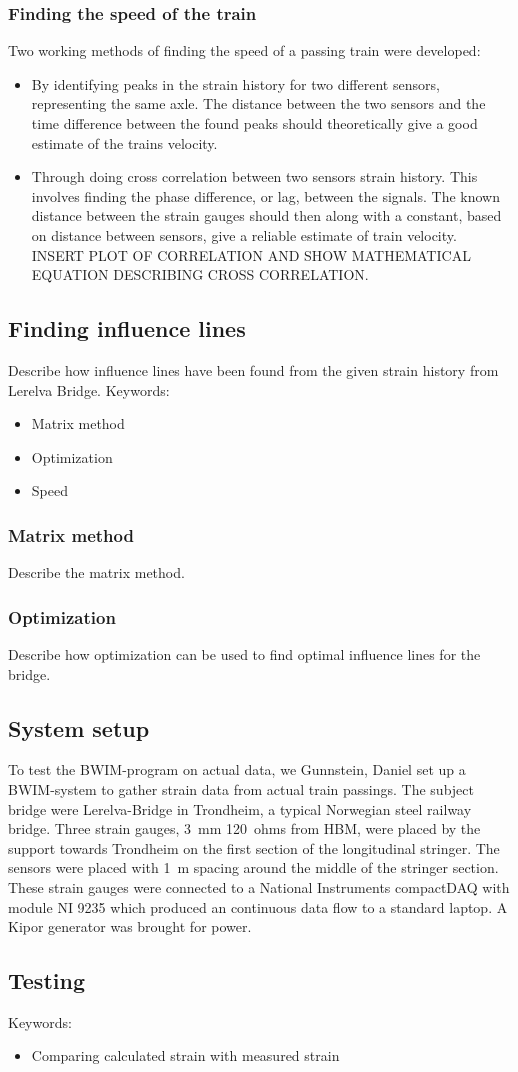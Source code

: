 \subsubsection{Finding the speed of the train}
Two working methods of finding the speed of a passing train were developed:
\begin{itemize}
 \item By identifying peaks in the strain history for two different sensors, representing the same axle. The distance between the two sensors and the time difference between the found peaks should theoretically give a good estimate of the trains velocity.
 \item Through doing cross correlation between two sensors strain history. This involves finding the phase difference, or lag, between the signals. The known distance between the strain gauges should then along with a constant, based on distance between sensors, give a reliable estimate of train velocity. INSERT PLOT OF CORRELATION AND SHOW MATHEMATICAL EQUATION DESCRIBING CROSS CORRELATION. 
\end{itemize}

\subsection{Finding influence lines}
Describe how influence lines have been found from the given strain history from Lerelva Bridge. 
Keywords:
\begin{itemize}
\item Matrix method
\item Optimization
\item Speed
\end{itemize}
\subsubsection{Matrix method}
Describe the matrix method.

\subsubsection{Optimization}
Describe how optimization can be used to find optimal influence lines for the bridge.

\subsection{System setup}
To test the BWIM-program on actual data, we Gunnstein, Daniel set up a BWIM-system to gather strain data from actual train passings. The subject bridge were Lerelva-Bridge in Trondheim, a typical Norwegian steel railway bridge. Three strain gauges, \SI{3}{\mm} \SI{120}{ohms} from HBM, were placed by the support towards Trondheim on the first section of the longitudinal stringer. The sensors were placed with \SI{1}{\m} spacing around the middle of the stringer section. These strain gauges were connected to a National Instruments compactDAQ with module NI 9235 which produced an continuous data flow to a standard laptop. A Kipor generator was brought for power.


\subsection{Testing}
Keywords:
\begin{itemize}
\item Comparing calculated strain with measured strain
\end{itemize}